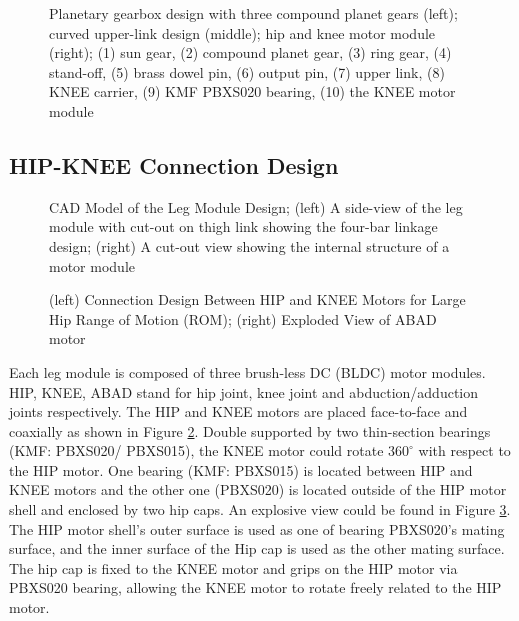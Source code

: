 \begin{figure}
	\centering
	\caption{Planetary gearbox design with three compound planet gears (left); curved upper-link design (middle); hip and knee motor module (right); (1) sun gear, (2) compound planet gear, (3) ring gear, (4) stand-off, (5) brass dowel pin, (6) output pin, (7) upper link, (8) KNEE carrier, (9) KMF PBXS020 bearing, (10) the KNEE motor module}
	\label{fig:gearbox}
\end{figure}



\subsection{\textbf{HIP-KNEE Connection Design}}
\label{sec:Design4ROM}

\begin{figure}
	\centering
	\caption{CAD Model of the Leg Module Design; (left) A side-view of the leg module with cut-out on thigh link showing the four-bar linkage design; (right) A cut-out view showing the internal structure of a motor module}
	\label{fig:LegDesign}
\end{figure}
\begin{figure}
	\centering
	\caption{(left) Connection Design Between HIP and KNEE Motors for Large Hip Range of Motion (ROM); (right) Exploded View of ABAD motor}
	\label{fig:KMFbearings}
\end{figure}

Each leg module is composed of three brush-less DC (BLDC) motor modules. HIP, KNEE, ABAD stand for hip joint, knee joint and abduction/adduction joints respectively. The HIP and KNEE motors are placed face-to-face and coaxially as shown in Figure \ref{fig:LegDesign}. Double supported by two thin-section bearings (KMF: PBXS020/ PBXS015), the KNEE motor could rotate $360^{\circ}$ with respect to the HIP motor. One bearing (KMF: PBXS015) is located between HIP and KNEE motors and the other one (PBXS020) is located outside of the HIP motor shell and enclosed by two hip caps. An explosive view could be found in Figure \ref{fig:KMFbearings}. The HIP motor shell's outer surface is used as one of bearing PBXS020's mating surface, and the inner surface of the Hip cap is used as the other mating surface. The hip cap is fixed to the KNEE motor and grips on the HIP motor via PBXS020 bearing, allowing the KNEE motor to rotate freely related to the HIP motor.

